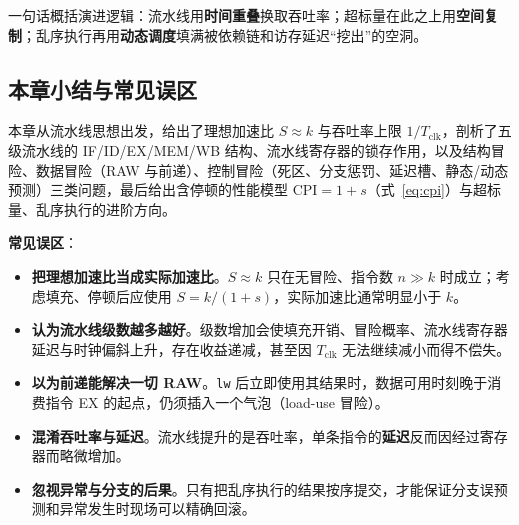 一句话概括演进逻辑：流水线用\textbf{时间重叠}换取吞吐率；超标量在此之上用\textbf{空间复制}；乱序执行再用\textbf{动态调度}填满被依赖链和访存延迟“挖出”的空洞。

\subsection{本章小结与常见误区}

本章从流水线思想出发，给出了理想加速比 $S \approx k$ 与吞吐率上限 $1/T_{\text{clk}}$，剖析了五级流水线的 IF/ID/EX/MEM/WB 结构、流水线寄存器的锁存作用，以及结构冒险、数据冒险（RAW 与前递）、控制冒险（死区、分支惩罚、延迟槽、静态/动态预测）三类问题，最后给出含停顿的性能模型 $\text{CPI} = 1+s$（式~\eqref{eq:cpi}）与超标量、乱序执行的进阶方向。

\textbf{常见误区}：
\begin{itemize}
    \item \textbf{把理想加速比当成实际加速比}。$S \approx k$ 只在无冒险、指令数 $n \gg k$ 时成立；考虑填充、停顿后应使用 $S = k/(1+s)$，实际加速比通常明显小于 $k$。
    \item \textbf{认为流水线级数越多越好}。级数增加会使填充开销、冒险概率、流水线寄存器延迟与时钟偏斜上升，存在收益递减，甚至因 $T_{\text{clk}}$ 无法继续减小而得不偿失。
    \item \textbf{以为前递能解决一切 RAW}。\texttt{lw} 后立即使用其结果时，数据可用时刻晚于消费指令 EX 的起点，仍须插入一个气泡（load-use 冒险）。
    \item \textbf{混淆吞吐率与延迟}。流水线提升的是吞吐率，单条指令的\textbf{延迟}反而因经过寄存器而略微增加。
    \item \textbf{忽视异常与分支的后果}。只有把乱序执行的结果按序提交，才能保证分支误预测和异常发生时现场可以精确回滚。
\end{itemize}

